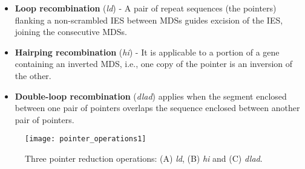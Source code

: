 \begin{itemize}
  \item \textbf{Loop recombination} (\textit{ld}) - A pair of repeat sequences (the pointers) flanking a non-scrambled IES between MDSs guides excision of the IES, joining the consecutive MDSs.
  \item \textbf{Hairping recombination} (\textit{hi}) -  It is applicable to a portion of a gene containing an inverted MDS, i.e., one copy of the pointer is an inversion of the other.
  \item \textbf{Double-loop recombination} (\textit{dlad}) applies when the segment enclosed between one pair of pointers overlaps the sequence enclosed between another pair of pointers.
\end{itemize}

\begin{figure}[h]
  \centering
    \texttt{[image: pointer\_operations1]}
    \caption{Three pointer reduction operations: (A) \textit{ld}, (B) \textit{hi} and (C) \textit{dlad}.}
\end{figure}  
